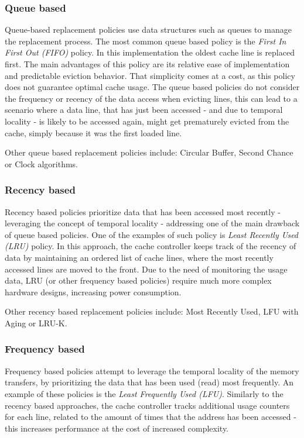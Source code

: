 \subsubsection{Queue based}
Queue-based replacement policies use data structures such as queues to manage the replacement process. The most common queue based policy is the
\textit{First In First Out (FIFO)} policy. In this implementation the oldest cache line is replaced first. The main advantages of this policy are  %
its relative ease of implementation and predictable eviction behavior. That simplicity comes at a cost, as this policy does not guarantee optimal cache usage. The queue
based policies do not consider the frequency or recency of the data access when evicting lines, this can lead to a scenario where a data line, that has just been accessed - and due to
temporal locality - is likely to be accessed again, might get prematurely evicted from the cache, simply because it was the first loaded line.

\vspace{10px}\noindent Other queue based replacement policies include: Circular Buffer, Second Chance or Clock algorithms. %

\subsubsection{Recency based}
Recency based policies prioritize data that has been accessed most recently - leveraging the concept of temporal locality - addressing one of
the main drawback of queue based policies. One of the examples of such policy is \textit{Least Recently Used (LRU)} policy. In this approach, the cache controller
keeps track of the recency of data by maintaining an ordered list of cache lines, where the most recently accessed lines are moved to the front. Due to the need of monitoring
the usage data, LRU (or other frequency based policies) require much more complex hardware designs, increasing power consumption. 

\vspace{10px}\noindent Other recency based replacement policies include: Most Recently Used, LFU with Aging or LRU-K. %

\subsubsection{Frequency based}
Frequency based policies attempt to leverage the temporal locality of the memory transfers, by prioritizing the data that has been used (read) most frequently.
An example of these policies is the \textit{Least Frequently Used (LFU)}. Similarly to the recency based approaches, the cache controller tracks additional usage counters
for each line, related to the amount of times that the address has been accessed - this increases performance at the cost of increased complexity.

